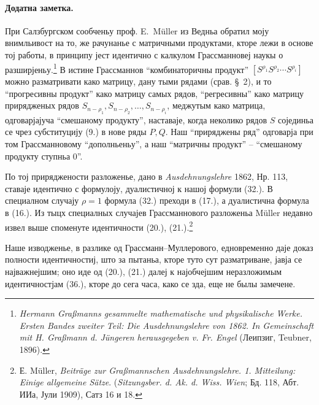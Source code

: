 \documentclass[11pt]{article}
\begin{document}
\paragraph{Додатна заметка.} При Салзбургском сообченьу проф. \mbox{E. Müller} из Ведньа обратил моју внимльивост на то, же рачунанье с матричными продуктами, кторе лежи в основе тој работы, в принципу јест идентично с калкулом Грассманновеј наукы о разширјеньу.\footnote{\emph{Hermann Graßmanns gesammelte mathematische und physikalische Werke. Ersten Bandes zweiter Teil: Die Ausdehnungslehre von 1862. In Gemeinschaft mit H. Graßmann d. Jüngeren herausgegeben v. Fr. Engel} (Леипзиг, Teubner, 1896).} В истине Грассманнов ``комбинаторичны продукт'' $[S^{\rho_1}S^{\rho_2}\cdots S^{\rho_i}]$ можно разматривати како матрицу, дану тыми рядами (срав. \S\ 2), и то ``прогресивны продукт'' како матрицу самых рядов, ``регресивны'' како матрицу прирядженых рядов $S_{n-\rho_1},S_{n-\rho_2},\ldots,S_{n-\rho_i}$, меджутым како матрица, одговарјајуча ``смешаному продукту'', наставаје, когда неколико рядов $S$ сојединьа се чрез субституцију (9.) в нове ряды $P,Q$. Наш ``приряджены ряд'' одговарја при том Грассманновому ``дополньеньу'', а наш ``матричны продукт'' -- ``смешаному продукту ступньа 0''.

По тој приряджености разложенье, дано в \emph{Ausdehnungslehre} 1862, Нр. 113, ставаје идентично с формулоју, дуалистичној к нашој формули (32.). В специалном случају $\rho=1$ формула (32.) преходи в (17.), а дуалистична формула в (16.). Из тыцх специалных случајев Грассманнового разложеньа \mbox{Müller} недавно извел выше споменуте идентичности (20.), (21.).\footnote{Е. \mbox{Müller}, \emph{Beiträge zur Graßmannschen Ausdehnungslehre. 1. Mitteilung: Einige allgemeine Sätze}. (\emph{Sitzungsber. d. Ak. d. Wiss. Wien}; Бд. 118, Абт. ИИа, Јули 1909), Сатз 16 и 18.}

Наше изводженье, в разлике од Грассманн--Муллерового, едновременно даје доказ полности идентичностиј, што за пытаньа, кторе туто сут разматриване, јавја се најважнејшим; оно иде од (20.), (21.) далеј к најобчејшим неразложимым идентичностјам (36.), кторе до сега часа, како се зда, еще не былы замечене.
\end{document}

